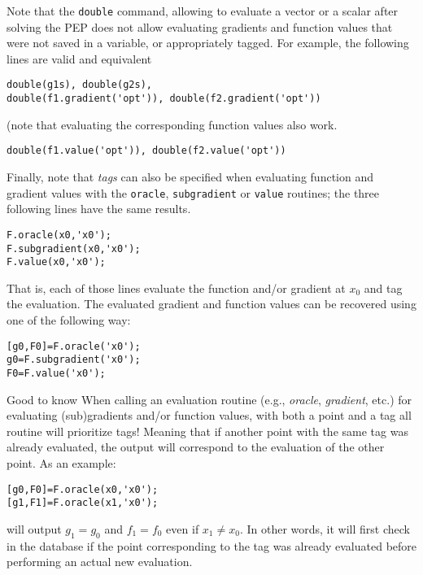 \documentclass[11pt,a4paper]{article}
\begin{document}
					Note that the \verb?double? command, allowing to evaluate a vector or a scalar after solving the PEP does not allow evaluating gradients and function values that were not saved in a variable, or appropriately tagged. For example, the following lines are valid and equivalent\\[-1cm]
					\begin{lstlisting}
double(g1s), double(g2s),
double(f1.gradient('opt')), double(f2.gradient('opt'))
					\end{lstlisting}
					(note that evaluating the corresponding function values also work.\\[-1cm]
					\begin{lstlisting}
double(f1.value('opt')), double(f2.value('opt'))
					\end{lstlisting}
					Finally, note that \emph{tags} can also be specified when evaluating function and gradient values with the \verb?oracle?, \verb?subgradient? or \verb?value? routines; the three following lines have the same results.\\[-1cm]
					\begin{lstlisting}
F.oracle(x0,'x0');
F.subgradient(x0,'x0');
F.value(x0,'x0');
					\end{lstlisting}
					That is, each of those lines evaluate the function and/or gradient at $x_0$ and tag the evaluation. The evaluated gradient and function values can be recovered using one of the  following way:\\[-1cm]
					\begin{lstlisting}
[g0,F0]=F.oracle('x0');
g0=F.subgradient('x0');
F0=F.value('x0');
					\end{lstlisting}
					\begin{bclogo}[logo=\bcattention, couleur=blue!30, arrondi =0.1, sousTitre=Specifying both a tag a a point]{Good to know}
						When calling an evaluation routine (e.g., \emph{oracle}, \emph{gradient}, etc.) for evaluating (sub)gradients and/or function values, with both a point and a tag all routine will prioritize tags! Meaning that if another point with the same tag was already evaluated, the output will correspond to the evaluation of the other point. As an example:\\[-1cm]
						\begin{lstlisting}
[g0,F0]=F.oracle(x0,'x0');
[g1,F1]=F.oracle(x1,'x0');
						\end{lstlisting}
						will output $g_1=g_0$ and $f_1=f_0$ even if $x_1\neq x_0$. In other words, it will first check in the database if the point corresponding to the tag was already evaluated before performing an actual new evaluation.
					\end{bclogo}
					\clearpage
\end{document}
